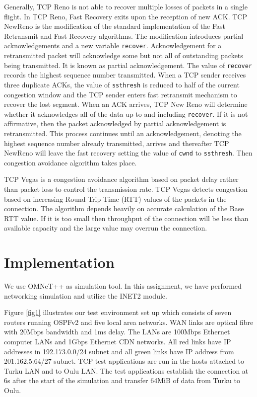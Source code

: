 \documentclass[conference,a4paper]{../../sty/IEEEtran}
\begin{document}
Generally, TCP Reno \cite{tcpreno} is not able to recover multiple losses of packets in a single flight. In TCP Reno, Fast Recovery exits upon the reception of new ACK. TCP NewReno is the modification of the standard implementation of the Fast Retransmit and Fast Recovery algorithms. The modification introduces partial acknowledgements and a new variable \texttt{recover}. Acknowledgement for a retransmitted packet will acknowledge some but not all of outstanding packets being transmitted. It is known as partial acknowledgement. The value of \texttt{recover} records the highest sequence number transmitted. When a TCP sender receives three duplicate ACKs, the value of \texttt{ssthresh} is reduced to half of the current congestion window and the TCP sender enters fast retransmit mechanism to recover the lost segment. When an ACK arrives, TCP New Reno will determine whether it acknowledges all of the data up to and including \texttt{recover}. If it is not affirmative, then the packet acknowledged by partial acknowledgement is retransmitted. This process continues until an acknowledgement, denoting the highest sequence number already transmitted, arrives and thereafter TCP NewReno \cite{tcpnewreno} will leave the fast recovery setting the value of \texttt{cwnd} to \texttt{ssthresh}. Then congestion avoidance algorithm takes place.


TCP Vegas \cite{brakmo1995tcp} is a congestion avoidance algorithm based on packet delay rather than packet loss to control the transmission rate. TCP Vegas detects congestion based on increasing Round-Trip Time (RTT) values of the packets in the connection. The algorithm depends heavily on accurate calculation of the Base RTT value. If it is too small then throughput of the connection will be less than available capacity and the large value may overrun the connection.

\section{Implementation}
We use OMNeT++ as simulation tool. In this assignment, we have performed networking simulation and utilize the INET2 module.

Figure \ref{fig1} illustrates our test environment set up which consists of seven routers running OSPFv2 and five local area networks.
WAN links are optical fibre with 20Mbps bandwidth and 1ms delay.
The LANs are 100Mbps Ethernet computer LANs and 1Gbps Ethernet CDN networks.
All red links have IP addresses in 192.173.0.0/24 subnet and all green links have IP address from 201.162.5.64/27 subnet.
TCP test applications are run in the hosts attached to Turku LAN and to Oulu LAN.
The test applications establish the connection at 6s after the start of the simulation and transfer 64MiB of data from Turku to Oulu. 
\end{document}
